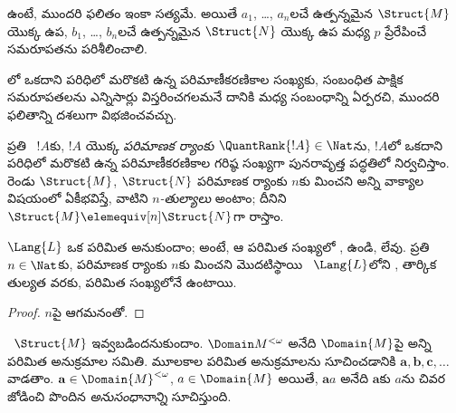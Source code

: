 \documentclass[../../../include/open-logic-section]{subfiles}
\begin{document}
\begin{rem}
 ఉంటే, ముందరి ఫలితం ఇంకా సత్యమే.
అయితే $a_1$, \dots, $a_n$లచే ఉత్పన్నమైన $\Struct{M}$ యొక్క
ఉప\-, $b_1$, \dots, $b_n$లచే ఉత్పన్నమైన
$\Struct{N}$ యొక్క ఉప\- మధ్య $p$ ప్రేరేపించే
సమరూపతను పరిశీలించాలి.
\end{rem}

లో ఒకదాని పరిధిలో మరొకటి ఉన్న
పరిమాణీకరణికాల సంఖ్యకు,
సంబంధిత పాక్షిక సమరూపతలను ఎన్నిసార్లు విస్తరించగలమనే దానికి మధ్య
సంబంధాన్ని ఏర్పరచి, ముందరి ఫలితాన్ని దశలుగా విభజించవచ్చు.

\begin{defn}
  ప్రతి ~$!A$కు, $!A$ యొక్క
  \emph{పరిమాణక ర్యాంకు} $\QuantRank{!A}\in\Nat$ను, $!A$లో
  ఒకదాని పరిధిలో మరొకటి ఉన్న పరిమాణీకరణికాల గరిష్ఠ సంఖ్యగా పునరావృత్త పద్ధతిలో నిర్వచిస్తాం. రెండు
   $\Struct{M}$, $\Struct{N}$ పరిమాణక
  ర్యాంకు $n$కు మించని అన్ని వాక్యాల విషయంలో
  ఏకీభవిస్తే, వాటిని \emph{$n$-తుల్యాలు} అంటాం; దీనిని
  $\Struct{M} \elemequiv[n] \Struct{N}$గా రాస్తాం.
\end{defn}

\begin{prop}
  $\Lang{L}$ ఒక పరిమిత  అనుకుందాం; అంటే, ఆ
   పరిమిత సంఖ్యలో
  ,
   ఉండి,
   లేవు. ప్రతి $n\in\Nat$కు,
  పరిమాణక ర్యాంకు $n$కు మించని మొదటిస్థాయి
  ~$\Lang{L}$లోని
  , తార్కిక తుల్యత వరకు,
  పరిమిత సంఖ్యలోనే ఉంటాయి.
\end{prop}

\begin{proof}
  $n$పై ఆగమనంతో.
\end{proof}

\begin{defn}
  ~$\Struct{M}$ ఇవ్వబడిందనుకుందాం.
  $\Domain M^{<\omega}$ అనేది $\Domain{M}$పై అన్ని పరిమిత అనుక్రమాల
  సమితి. మూలకాల పరిమిత అనుక్రమాలను సూచించడానికి
  $\mathbf{a},\mathbf{b},\mathbf{c},\ldots$ వాడతాం.
  $\mathbf{a}\in\Domain{M}^{<\omega}$, $a\in\Domain{M}$ అయితే,
  $\mathbf{a}a$ అనేది $\mathbf{a}$కు $a$ను చివర జోడించి పొందిన
  \emph{అనుసంధానాన్ని} సూచిస్తుంది.
\end{defn}
\end{document}
